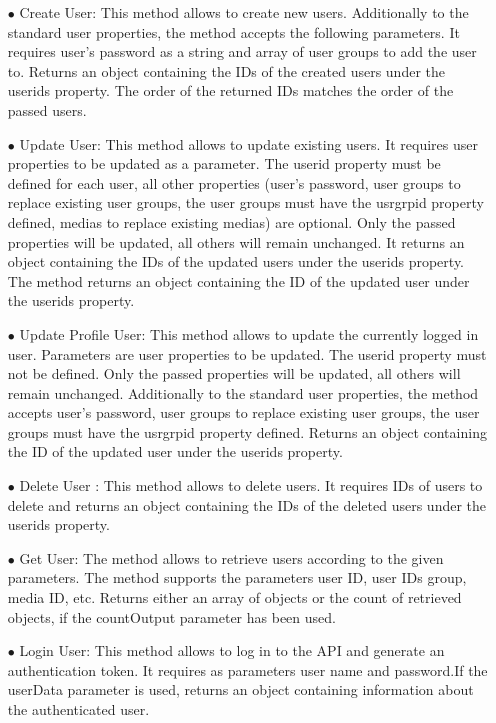 \documentclass{article}
\begin{document}
\begin{itemize}
	\item[$\bullet$] 
Create User: This method allows to create new users. Additionally to the standard user properties, the method accepts the following parameters. It requires user's password as a  string and array of user groups to add the user to.  Returns an object containing the IDs of the created users under the userids property. The order of the returned IDs matches the order of the passed users.
	\item[$\bullet$] 
Update User: This method allows to update existing users. It requires user properties to be updated as a parameter. The userid property must be defined for each user, all other properties (user's password, user groups to replace existing user groups, the user groups must have the usrgrpid property defined, medias to replace existing medias) are optional. Only the passed properties will be updated, all others will remain unchanged. It returns an object containing the IDs of the updated users under the userids property. The method returns an object containing the ID of the updated user under the userids property.
	\item[$\bullet$] 
Update Profile User: This method allows to update the currently logged in user.  Parameters are user properties to be updated. The userid property must not be defined. Only the passed properties will be updated, all others will remain unchanged. Additionally to the standard user properties, the method accepts user's password, user groups to replace existing user groups, the user groups must have the usrgrpid property defined.  Returns an object containing the ID of the updated user under the userids property. 

 \item[$\bullet$]Delete User : This method allows to delete users. It requires IDs of users to delete and  returns an object containing the IDs of the deleted users under the userids property. 

\item[$\bullet$]Get User: The method allows to retrieve users according to the given parameters. The method supports the parameters  user ID, user IDs group, media ID, etc. Returns either an array of objects or the count of retrieved objects, if the countOutput parameter has been used.

\item[$\bullet$] Login User: This method allows to log in to the API and generate an authentication token.  It requires as  parameters user name and password.If the userData parameter is used, returns an object containing information about the authenticated user.


\end{itemize}
\end{document}
